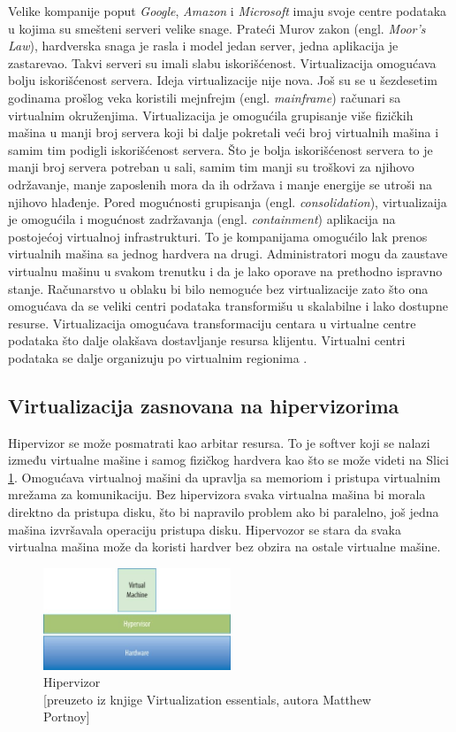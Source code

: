 \documentclass[12pt,oneside]{memoir}
\begin{document}
Velike kompanije poput \emph{Google}, \emph{Amazon} i \emph{Microsoft} imaju svoje centre podataka u kojima su smešteni serveri velike snage. Prateći Murov zakon (engl. \emph{Moor's Law}), hardverska snaga je rasla i model jedan server, jedna aplikacija je zastarevao. Takvi serveri su imali slabu iskorišćenost. Virtualizacija omogućava bolju iskorišćenost servera. Ideja virtualizacije nije nova. Još su se u šezdesetim godinama prošlog veka koristili mejnfrejm (engl. \emph{mainframe}) računari sa virtualnim okruženjima. Virtualizacija je omogućila grupisanje više fizičkih mašina u manji broj servera koji bi dalje pokretali veći broj virtualnih mašina i samim tim podigli iskorišćenost servera. Što je bolja iskorišćenost servera to je manji broj servera potreban u sali, samim tim manji su troškovi za njihovo održavanje, manje zaposlenih mora da ih održava i manje energije se utroši na njihovo hlađenje. Pored mogućnosti grupisanja (engl. \emph{consolidation}), virtualizaija je omogućila i mogućnost zadržavanja (engl. \emph{containment}) aplikacija na postojećoj virtualnoj infrastrukturi. To je kompanijama omogućilo lak prenos virtualnih mašina sa jednog hardvera na drugi. Administratori mogu da zaustave virtualnu mašinu u svakom trenutku i da je lako oporave na prethodno ispravno stanje. Računarstvo u oblaku bi bilo nemoguće bez virtualizacije zato što ona omogućava da se veliki centri podataka transformišu u skalabilne i lako dostupne resurse. Virtualizacija omogućava transformaciju centara u virtualne centre podataka što dalje olakšava dostavljanje resursa klijentu. Virtualni centri podataka se dalje organizuju po virtualnim regionima \cite{ve}.

\subsection{Virtualizacija zasnovana na hipervizorima}
Hipervizor se može posmatrati kao arbitar resursa. To je softver koji se nalazi između virtualne mašine i samog fizičkog hardvera kao što se može videti na Slici \ref{fig:hipervizor}. Omogućava virtualnoj mašini da upravlja sa memoriom i pristupa virtualnim mrežama za komunikaciju\cite{ve}. Bez hipervizora svaka virtualna mašina bi morala direktno da pristupa disku, što bi napravilo problem ako bi paralelno, još jedna mašina izvršavala operaciju pristupa disku. Hipervozor se stara da svaka virtualna mašina može da koristi hardver bez obzira na ostale virtualne mašine.
\begin{figure}[!ht]
  \centering
  \includegraphics[width=0.5\textwidth]{Slika 1.jpg}
  \caption{Hipervizor\\\footnotesize[preuzeto iz knjige Virtualization essentials, autora Matthew Portnoy]}
  \label{fig:hipervizor}
\end{figure}
 
\end{document}
